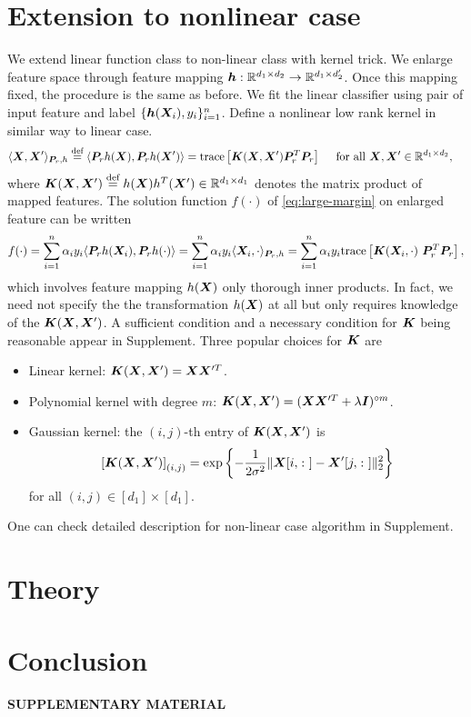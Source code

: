 \documentclass[12pt]{article}
\begin{document}
\section{Extension to nonlinear case}
\label{sec:nonlinear}
We extend linear function class to non-linear class with kernel trick. We enlarge feature space through feature mapping $\bm{h}:\mathbb{R}^{d_1\times d_2}\rightarrow \mathbb{R	}^{d_1\times d_2'}$. Once this mapping fixed, the procedure is the same as before.
We fit the linear classifier using pair of input feature and label $\{\bm{h}(\bm X_i),y_i\}_{i=1}^n$.
Define a nonlinear low rank kernel in similar way to linear case.
\begin{align}\label{eq:nonlinear kernel}
\langle \bm X,\bm X'\rangle_{\bm{P}_r,h} &\stackrel{\text{def}}{=} \langle \bm{P}_r h(\bm X),\bm{P}_r h(\bm X')\rangle = \text{trace}\left[\bm K(\bm X,\bm X')\bm{P}_r^T\bm{P}_r\right]\quad\text{ for all } \bm X,\bm X'\in\mathbb{R}^{d_1\times d_2},
\end{align}
where $\bm K(\bm X,\bm X')\stackrel{\text{def}}{=} h(\bm X)h^T(\bm X')
\in \mathbb{R}^{d_1\times d_1}$ denotes the matrix product of mapped features.
The solution function $ f(\cdot)$ of \eqref{eq:large-margin} on enlarged feature can be written 
\begin{align}
f(\cdot) = \sum_{i=1}^n\alpha _i y_i \langle \bm{P}_r h(\bm X_i), \bm{P}_r h(\cdot)\rangle =  \sum_{i=1}^n  \alpha _i y_i \langle \bm X_i, \cdot\rangle_{ \bm{P}_r,h}  =  \sum_{i=1}^n  \alpha _i y_i \text{trace}\left[\bm K(\bm X_i,\cdot)\ \bm{P}_r^T \bm{P}_r\right],
\end{align}
which involves feature mapping $h(\bm X)$ only thorough inner products. In fact, we need not specify the the transformation $h(\bm X)$ at all but only requires knowledge of the $
\bm K(\bm X,\bm X')$. A sufficient condition and a necessary condition for $\bm K$ being reasonable appear in Supplement.
Three popular choices for $\bm K$ are
\begin{itemize}
\item Linear kernel: $\bm K(\bm X,\bm X')=\bm X\bm X'^T$.
\item Polynomial kernel with degree $m$: $\bm K(\bm X,\bm X')=(\bm X\bm X'^T+\lambda\bm I)^{\circ m}$.
\item Gaussian kernel: the $(i,j)$-th entry of $\bm K(\bm X,\bm X')$ is 
\[
\left[\bm K(\bm X,\bm X')\right]_{(i,j)}=\exp\left\{-{1\over 2\sigma^2} \|\bm X[i,\colon]-\bm X'[j,\colon]\|_2^2\right\}
\]
for all $(i,j)\in[d_1]\times[d_1]$.
\end{itemize}
One can check detailed description for non-linear case algorithm in Supplement.
\section{Theory}
\label{sec:thm}
\section{Conclusion}
\label{sec:conc}


\bigskip
\begin{center}
{\large\bf SUPPLEMENTARY MATERIAL}
\end{center}




\end{document}
